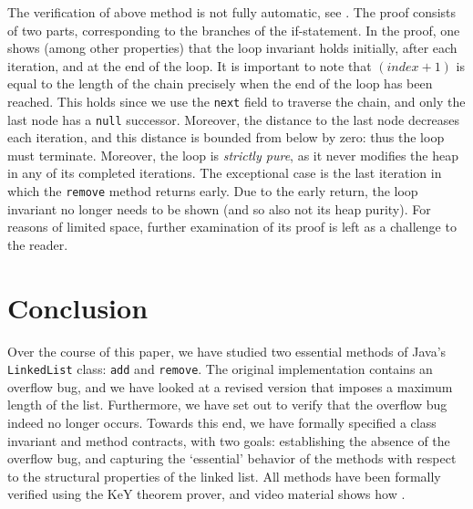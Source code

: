 \documentclass[runningheads]{llncs}
\theoremstyle{remark}
\begin{document}
\pagebreak



The verification of above method is not fully automatic, see . The proof consists of two parts, corresponding to the branches of the if-statement. In the proof, one shows (among other properties) that the loop invariant holds  initially, after each iteration, and at the end of the loop. It is important to note that $(\mathit{index}+1)$ is equal to the length of the chain precisely when the end of the loop has been reached. This holds since we use the \texttt{next} field to traverse the chain, and only the last node has a \texttt{null} successor. Moreover, the distance to the last node decreases each iteration, and this distance is bounded from below by zero: thus the loop must terminate. Moreover, the loop is \emph{strictly pure}, as it never modifies the heap in any of its completed iterations. The exceptional case is the last iteration in which the \texttt{remove} method returns early. Due to the early return, the loop invariant no longer needs to be shown (and so also not its heap purity). For reasons of limited space, further examination of its proof is left as a challenge to the reader.

\section{Conclusion}\label{sec:conclusion}

Over the course of this paper, we have studied two essential methods of Java's \texttt{LinkedList} class: \texttt{add} and \texttt{remove}. The original implementation contains an overflow bug, and we have looked at a revised version that imposes a maximum length of the list. Furthermore, we have set out to verify that the overflow bug indeed no longer occurs. Towards this end, we have formally specified a class invariant and method contracts, with two goals: establishing the absence of the overflow bug, and capturing the `essential' behavior of the methods with respect to the structural properties of the linked list. All methods have been formally verified  using the KeY theorem prover, and video material shows how .
\end{document}
